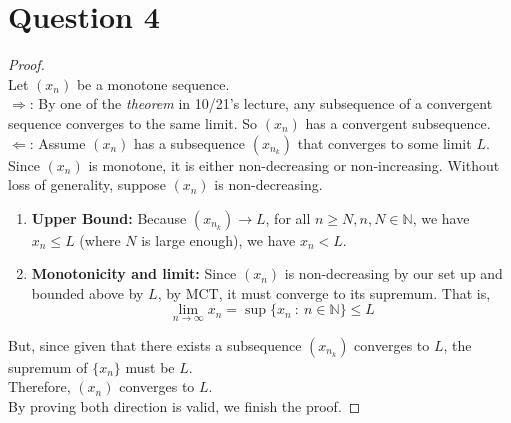 \documentclass{article}
\begin{document}
\section*{Question 4}
\begin{proof}
    \hspace{0.001cm}
    \\
    Let $(x_n)$ be a monotone sequence.
    \\
    $\Rightarrow$: By one of the \textit{theorem} in 10/21's lecture, any subsequence of a convergent sequence converges to the same limit. So $(x_n)$ has a convergent subsequence.
    \\
    $\Leftarrow$: Assume $(x_n)$ has a subsequence $(x_{n_k})$ that converges to some limit $L$.
    \\
    Since $(x_n)$ is monotone, it is either non-decreasing or non-increasing. Without loss of generality, suppose $(x_n)$ is non-decreasing.

    \begin{enumerate}
        \item \textbf{Upper Bound: } Because $(x_{n_k}) \rightarrow L$, for all $n \geq N, n, N \in \mathbb{N}$, we have $x_n \leq L$
        (where $N$ is large enough), we have $x_n < L$.
        \item \textbf{Monotonicity and limit: } Since $(x_n)$ is non-decreasing by our set up and bounded above by $L$, by MCT, it must converge to its supremum. That is,
        \[ \lim_{n \rightarrow \infty} x_n = \sup\{x_n \ : \ n \in \mathbb{N} \} \leq L \]
    \end{enumerate}
    But, since given that there exists a subsequence $(x_{n_k})$ converges to $L$, the supremum of $\{x_n\}$ must be $L$.
    \\
    Therefore, $(x_n)$ converges to $L$.
    \\
    By proving both direction is valid, we finish the proof.
\end{proof}
\end{document}
